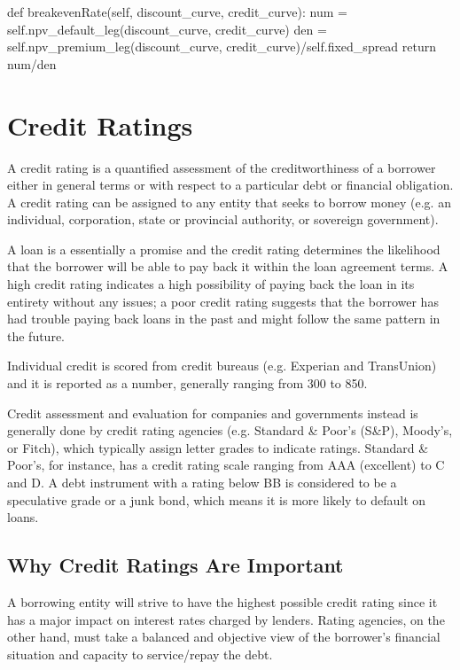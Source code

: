 \begin{ipython}
def breakevenRate(self, discount_curve, credit_curve):
    num = self.npv_default_leg(discount_curve, credit_curve)
    den = self.npv_premium_leg(discount_curve, credit_curve)/self.fixed_spread
    return num/den
\end{ipython}

\section{Credit Ratings}\label{credit-ratings}

A credit rating is a quantified assessment of the creditworthiness of a borrower either in general terms or with respect to a particular debt or financial obligation. A credit rating can be assigned to any entity that seeks to borrow money (e.g. an individual, corporation, state or provincial authority, or sovereign government).

A loan is a essentially a promise and the credit rating determines the likelihood that the borrower will be able to pay back it within the loan agreement terms. A high credit rating indicates a high possibility of paying back the loan in its entirety without any issues; a poor credit rating suggests that the borrower has had trouble paying back loans in the past and might follow the same pattern in the future.

Individual credit is scored from credit bureaus (e.g. Experian and TransUnion) and it is reported as a number, generally ranging from 300 to 850.

Credit assessment and evaluation for companies and governments instead is generally done by credit rating agencies (e.g. Standard \& Poor's (S\&P), Moody's, or Fitch), which typically assign letter grades to indicate ratings. Standard \& Poor's, for instance, has a credit rating scale ranging from AAA (excellent) to C and D. A debt  instrument with a rating below BB is considered to be a speculative grade or a junk bond, which means it is more likely to default on loans.

\subsection{Why Credit Ratings Are Important}\label{why-credit-ratings-are-important}

A borrowing entity will strive to have the highest possible credit rating since it has a major impact on interest rates charged by lenders. Rating agencies, on the other hand, must take a balanced and objective view of the borrower's financial situation and capacity to service/repay the debt.

